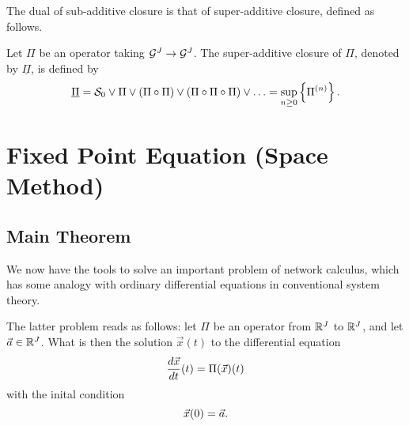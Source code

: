 
The dual of sub-additive closure is that of super-additive closure, defined as follows.

\begin{definition}
Let $\Pi$ be an operator taking $\mathcal G^J \rightarrow \mathcal G^J$.
The super-additive closure of $\Pi$,  denoted by $\underline{\Pi}$, is defined by
\begin{equation}
\mylabel{eq:superoperatorclosure}
\underline{\Pi} = \calS_0 \vee \Pi \vee (\Pi \circ \Pi) \vee (\Pi \circ \Pi \circ \Pi) \vee \ldots = \sup_{n \geq 0} \left\{ \Pi^{(n)} \right\}.
\end{equation}
\end{definition}


\section{Fixed Point Equation (Space Method)}

\subsection{Main Theorem}

We now have the tools to solve an important problem of network
calculus, which has some analogy with ordinary differential
equations in conventional system theory.

The latter problem reads as follows: let $\Pi$ be an operator from $\mathbb{R}^J$ to $\mathbb{R}^J$, and let $\vec{a} \in \mathbb{R}^J$.
What is then the solution $\vec{x}(t)$ to the differential equation %
\begin{equation}
\mylabel{eq:ode}
\frac{d\vec{x}}{dt}(t) = \Pi(\vec{x})(t)
\end{equation}
with the inital condition
\begin{equation}
\mylabel{eq:odeinit}
\vec{x}(0) = \vec{a}.
\end{equation}

